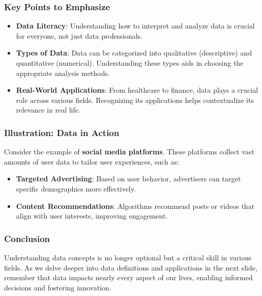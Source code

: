 \documentclass{beamer}
\begin{document}
\begin{frame}[fragile]
    \frametitle{Key Points to Emphasize}
    \begin{itemize}
        \item \textbf{Data Literacy}: Understanding how to interpret and analyze data is crucial for everyone, not just data professionals.
        
        \item \textbf{Types of Data}: Data can be categorized into qualitative (descriptive) and quantitative (numerical). Understanding these types aids in choosing the appropriate analysis methods.
        
        \item \textbf{Real-World Applications}: From healthcare to finance, data plays a crucial role across various fields. Recognizing its applications helps contextualize its relevance in real life.
    \end{itemize}
\end{frame}

\begin{frame}[fragile]
    \frametitle{Illustration: Data in Action}
    Consider the example of \textbf{social media platforms}. These platforms collect vast amounts of user data to tailor user experiences, such as:
    \begin{itemize}
        \item \textbf{Targeted Advertising}: Based on user behavior, advertisers can target specific demographics more effectively.
        \item \textbf{Content Recommendations}: Algorithms recommend posts or videos that align with user interests, improving engagement.
    \end{itemize}
\end{frame}

\begin{frame}[fragile]
    \frametitle{Conclusion}
    Understanding data concepts is no longer optional but a critical skill in various fields. As we delve deeper into data definitions and applications in the next slide, remember that data impacts nearly every aspect of our lives, enabling informed decisions and fostering innovation.
\end{frame}
\end{document}
